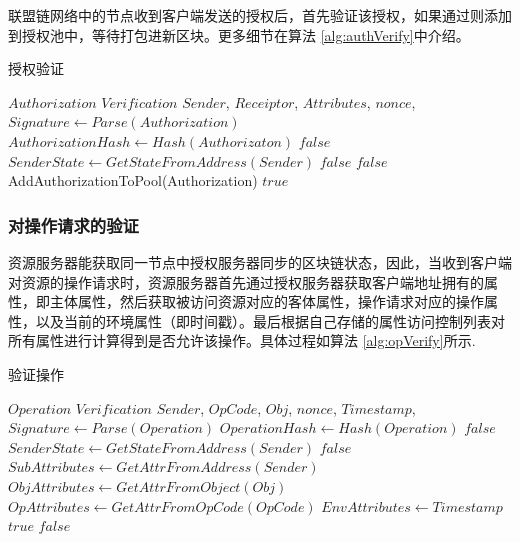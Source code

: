 联盟链网络中的节点收到客户端发送的授权后，首先验证该授权，如果通过则添加到授权池中，等待打包进新区块。更多细节在算法 \ref{alg:authVerify}中介绍。

 \begin{algorithm}
 \caption{授权验证}\label{alg:authVerify}
   \begin{algorithmic}[!htbp]
   \renewcommand{\algorithmicrequire}{\textbf{Input:}}
   \renewcommand{\algorithmicensure}{\textbf{Output:}}
   \REQUIRE $Authorization$
   \ENSURE  $Verification$
    \STATE $Sender$, $Receiptor$, $Attributes$, $nonce$, $Signature \gets Parse(Authorization)$
    \STATE $AuthorizationHash \gets Hash(Authorizaton)$
      \RETURN $false$
    \ENDIF
    \STATE $SenderState \gets GetStateFromAddress(Sender)$
      \RETURN $false$
    \ENDIF
        \RETURN $false$
      \ENDIF
    \ENDFOR
    \STATE AddAuthorizationToPool(Authorization)
   \RETURN $true$
   \end{algorithmic}
 \end{algorithm}

\subsubsection{对操作请求的验证}

资源服务器能获取同一节点中授权服务器同步的区块链状态，因此，当收到客户端对资源的操作请求时，资源服务器首先通过授权服务器获取客户端地址拥有的属性，即主体属性，然后获取被访问资源对应的客体属性，操作请求对应的操作属性，以及当前的环境属性（即时间戳）。最后根据自己存储的属性访问控制列表对所有属性进行计算得到是否允许该操作。具体过程如算法 \ref{alg:opVerify}所示.

 \begin{algorithm}
 \caption{验证操作}
   \begin{algorithmic}[H]\label{alg:opVerify}
   \renewcommand{\algorithmicrequire}{\textbf{Input:}}
   \renewcommand{\algorithmicensure}{\textbf{Output:}}
   \REQUIRE $Operation$
   \ENSURE  $Verification$
    \STATE $Sender$, $OpCode$, $Obj$, $nonce$, $Timestamp$, $Signature \gets Parse(Operation)$
    \STATE $OperationHash \gets Hash(Operation)$
      \RETURN $false$
    \ENDIF
    \STATE $SenderState \gets GetStateFromAddress(Sender)$
      \RETURN $false$
    \ENDIF
    \STATE$SubAttributes \gets GetAttrFromAddress(Sender)$
    \STATE$ObjAttributes \gets GetAttrFromObject(Obj)$
    \STATE$OpAttributes \gets GetAttrFromOpCode(OpCode)$
    \STATE$EnvAttributes \gets Timestamp$
        \RETURN $true$
      \ENDIF
    \ENDFOR
   \RETURN $false$
   \end{algorithmic}
 \end{algorithm}

